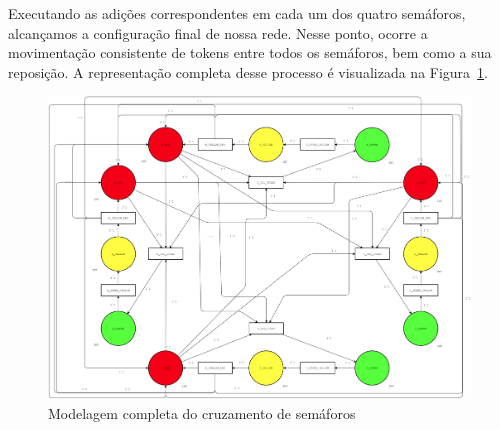 Executando as adições correspondentes em cada um dos quatro semáforos, alcançamos a configuração final de nossa rede.
Nesse ponto, ocorre a movimentação consistente de tokens entre todos os semáforos, bem como a sua reposição.
A representação completa desse processo é visualizada na Figura~\ref{fig:full_petri_net}.

\begin{figure}[ht]
	\centering
	\includegraphics[width=1\textwidth]{images/full_petri_net.png}
	\caption{Modelagem completa do cruzamento de semáforos}
    \label{fig:full_petri_net}
\end{figure}